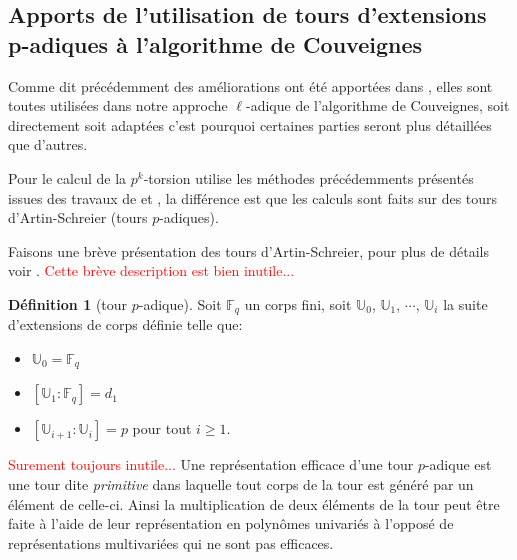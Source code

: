 \documentclass[10pt,a4paper]{book}
\theoremstyle{plain}
\theoremstyle{definition}
\theoremstyle{definition}
\theoremstyle{definition}
\theoremstyle{definition}
\newtheorem{defi}[thm]{Définition}
\theoremstyle{remark}
\theoremstyle{remark}
\begin{document}
\subsection{Apports de l'utilisation de tours d'extensions p-adiques à l'algorithme de Couveignes}

Comme dit précédemment des améliorations ont été apportées dans \cite{DeFeo11}, elles sont toutes utilisées dans notre approche $\ell$-adique de l'algorithme de Couveignes, soit directement soit adaptées c'est pourquoi certaines parties seront plus détaillées que d'autres.

Pour le calcul de la $p^k$-torsion \cite{DeFeo11} utilise les méthodes précédemments présentés issues des travaux de \cite{Gunji76} et \cite{Voloch90}, la différence est que les calculs sont faits sur des tours d'Artin-Schreier (tours $p$-adiques).

Faisons une brève présentation des tours d'Artin-Schreier, pour plus de détails voir \cite{DeFeo-Shost'12}.
\textcolor{red}{Cette brève description est bien inutile...}
\begin{defi}[tour $p$-adique]
Soit $\mathbb{F}_q$ un corps fini, soit $\mathbb{U}_0$, $\mathbb{U}_1$, $\cdots$, $\mathbb{U}_i$ la suite d'extensions de corps définie telle que:
\begin{itemize}
\item $\mathbb{U}_0=\mathbb{F}_q$
\item $[\mathbb{U}_1 : \mathbb{F}_q]= d_1$
\item $[\mathbb{U}_{i+1} :\mathbb{U}_i]= p$ pour tout $i \geqslant 1$.
\end{itemize}
\end{defi}
\textcolor{red}{Surement toujours inutile...}
Une représentation efficace d'une tour $p$-adique est une tour dite \emph{primitive} dans laquelle tout corps de la tour est généré par un élément de celle-ci. Ainsi la multiplication de deux éléments de la tour peut être faite à l'aide de leur représentation en polynômes univariés à l'opposé de représentations multivariées qui ne sont pas efficaces.
\end{document}
